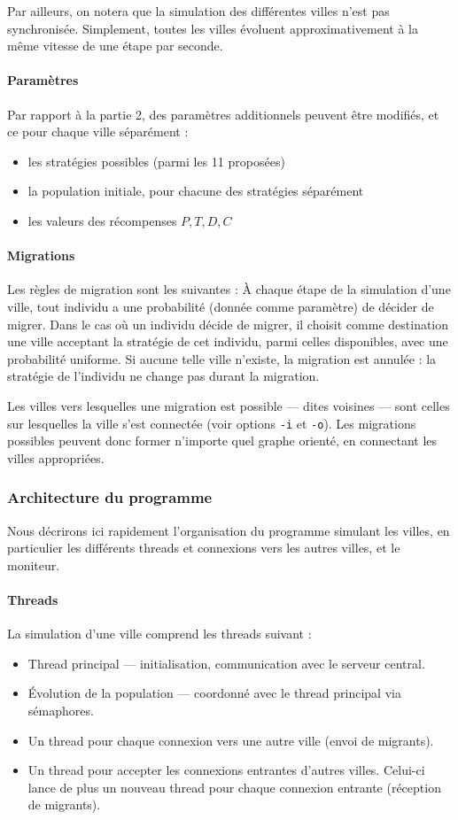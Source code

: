 \documentclass[10pt]{article}
\begin{document}
Par ailleurs, on notera que la simulation des différentes villes n'est pas synchronisée. 
Simplement, toutes les villes évoluent approximativement à la même vitesse de une étape par seconde.

\paragraph{Paramètres}
Par rapport à la partie 2, des paramètres additionnels peuvent être modifiés, et ce pour chaque ville séparément :
\begin{itemize}
\item les stratégies possibles (parmi les 11 proposées)
\item la population initiale, pour chacune des stratégies séparément
\item les valeurs des récompenses $P,T,D,C$
\end{itemize}

\paragraph{Migrations}
Les règles de migration sont les suivantes :
À chaque étape de la simulation d'une ville, tout individu a une probabilité (donnée comme paramètre) de décider de migrer.
Dans le cas où un individu décide de migrer, il choisit comme destination une ville acceptant la stratégie de cet individu, parmi celles disponibles,
avec une probabilité uniforme. Si aucune telle ville n'existe, la migration est annulée : la stratégie de l'individu ne change pas
durant la migration.

Les villes vers lesquelles une migration est possible --- dites voisines --- sont celles sur lesquelles la ville s'est connectée
(voir options \verb|-i| et \verb|-o|). Les migrations possibles peuvent donc former n'importe quel graphe orienté, en connectant
les villes appropriées.

\subsubsection{Architecture du programme}
Nous décrirons ici rapidement l'organisation du programme simulant les villes,
en particulier les différents threads et connexions vers les autres villes, et le moniteur.

\paragraph{Threads}
La simulation d'une ville comprend les threads suivant :
\begin{itemize}
\item Thread principal --- initialisation, communication avec le serveur central.
\item Évolution de la population --- coordonné avec le thread principal via sémaphores.
\item Un thread pour chaque connexion vers une autre ville (envoi de migrants).
\item Un thread pour accepter les connexions entrantes d'autres villes.
      Celui-ci lance de plus un nouveau thread pour chaque connexion entrante (réception de migrants).
\end{itemize}
\end{document}
